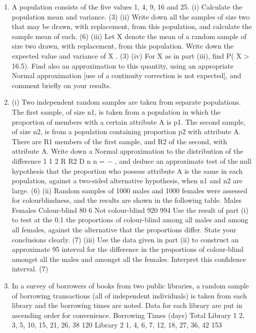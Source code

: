 \begin{enumerate}
\item A population consists of the five values 1, 4, 9, 16 and 25.
(i) Calculate the population mean and variance. (3)
(ii) Write down all the samples of size two that may be drawn, with replacement,
from this population, and calculate the sample mean of each. (6)
(iii) Let X denote the mean of a random sample of size two drawn, with
replacement, from this population. Write down the expected value and
variance of X . (3)
(iv) For X as in part (iii), find P( X > 16.5). Find also an approximation to this
quantity, using an appropriate Normal approximation [use of a continuity
correction is not expected], and comment briefly on your results.
\item (i) Two independent random samples are taken from separate populations. The
first sample, of size n1, is taken from a population in which the proportion of
members with a certain attribute A is p1. The second sample, of size n2, is
from a population containing proportion p2 with attribute A. There are R1
members of the first sample, and R2 of the second, with attribute A.
Write down a Normal approximation to the distribution of the difference
1
1 2
R R2 D
n n = − , and deduce an approximate test of the null hypothesis that the
proportion who possess attribute A is the same in each population, against a
two-sided alternative hypothesis, when n1 and n2 are large.
(6)
(ii) Random samples of 1000 males and 1000 females were assessed for colourblindness,
and the results are shown in the following table.
Males Females
Colour-blind 80 6
Not colour-blind 920 994
Use the result of part (i) to test at the 0.1%
the proportions of colour-blind among all males and among all females, against
the alternative that the proportions differ. State your conclusions clearly.
(7)
(iii) Use the data given in part (ii) to construct an approximate 95%
interval for the difference in the proportions of colour-blind amongst all the
males and amongst all the females. Interpret this confidence interval.
(7)
\item In a survey of borrowers of books from two public libraries, a random sample of
borrowing transactions (all of independent individuals) is taken from each library and
the borrowing times are noted. Data for each library are put in ascending order for
convenience.
Borrowing Times (days) Total
Library 1 2, 3, 5, 10, 15, 21, 26, 38 120
Library 2 1, 4, 6, 7, 12, 18, 27, 36, 42 153

\end{enumerate}
